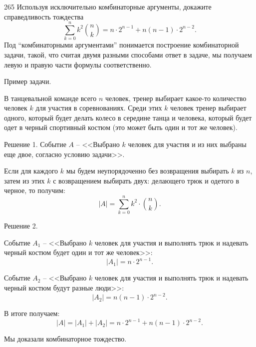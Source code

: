 \begin{task}{265}
Используя исключительно комбинаторные аргументы, докажите справедливость тождества \[\sum_{k=0}^n{k^2\binom{n}{k}}=n\cdot 2^{n-1}+n(n-1)\cdot 2^{n-2}.\]
Под “комбинаторными аргументами” понимается построение комбинаторной задачи, такой, что считая двумя разными способами ответ в задаче, мы получаем левую и правую части формулы соответственно.
\end{task}

\begin{solution}

Пример задачи.

В танцевальной команде всего $n$ человек, тренер выбирает какое-то количество человек $k$ для участия в соревнованиях. Среди этих $k$ человек тренер выбирает одного, который будет делать колесо в середине танца и человека, который будет одет в черный спортивный костюм (это может быть один и тот же человек).

Решение 1.
Событие $A$ -- <<Выбрано $k$ человек для участия и из них выбраны еще двое, согласно условию задачи>>.

Если для каждого $k$ мы будем неупорядоченно без возвращения выбирать $k$ из $n$, затем из этих $k$ с возвращением выбирать двух: делающего трюк и одетого в черное, то получим:
\[|A|=\sum_{k=0}^n{k^2\cdot\binom{n}{k}}.\]

Решение 2.

Событие $A_1$ -- <<Выбрано $k$ человек для участия и выполнять трюк и надевать черный костюм будет один и тот же человек>>:
\[|A_1|=n\cdot 2^{n-1}.\]

Событие $A_2$ -- <<Выбрано $k$ человек для участия и выполнять трюк и надевать черный костюм будут разные люди>>:
\[|A_2|=n(n-1)\cdot 2^{n-2}.\]

В итоге получаем:
\[|A|=|A_1|+|A_2|=n\cdot 2^{n-1}+n(n-1)\cdot 2^{n-2}.\]

Мы доказали комбинаторное тождество.

\end{solution}
